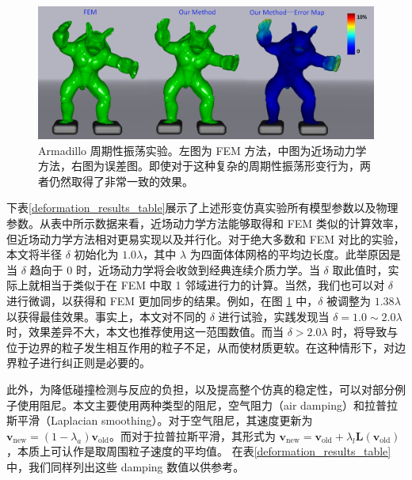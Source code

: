 \begin{figure}[!htb]
  \centering
  \captionsetup{justification=centering}
  \includegraphics[width=0.9\linewidth]{chap/image/demo_armadillo_vs_fem}

  \caption{\label{demo_armadillo_vs_fem}
           Armadillo 周期性振荡实验。左图为 FEM 方法，中图为近场动力学方法，右图为误差图。即使对于这种复杂的周期性振荡形变行为，两者仍然取得了非常一致的效果。
          }
\end{figure}

下表\ref{deformation_results_table}展示了上述形变仿真实验所有模型参数以及物理参数。从表中所示数据来看，近场动力学方法能够取得和 FEM 类似的计算效率，但近场动力学方法相对更易实现以及并行化。对于绝大多数和 FEM 对比的实验，本文将半径 $\delta$ 初始化为 $1.0\lambda$，其中 $\lambda$ 为四面体体网格的平均边长度。此举原因是当 $\delta$ 趋向于 0 时，近场动力学将会收敛到经典连续介质力学。当 $\delta$ 取此值时，实际上就相当于类似于在 FEM 中取 1 邻域进行力的计算。当然，我们也可以对 $\delta$ 进行微调，以获得和 FEM 更加同步的结果。例如，在图 \ref{demo_armadillo_vs_fem} 中，$\delta$ 被调整为 $1.38\lambda$ 以获得最佳效果。事实上，本文对不同的 $\delta$ 进行试验，实践发现当 $\delta = 1.0\sim2.0 \lambda$ 时，效果差异不大，本文也推荐使用这一范围数值。而当 $\delta > 2.0 \lambda$ 时，将导致与位于边界的粒子发生相互作用的粒子不足，从而使材质更软。在这种情形下，对边界粒子进行纠正则是必要的。

此外，为降低碰撞检测与反应的负担，以及提高整个仿真的稳定性，可以对部分例子使用阻尼。本文主要使用两种类型的阻尼，空气阻力（air damping）和拉普拉斯平滑（Laplacian smoothing）。对于空气阻尼，其速度更新为 $\textbf{v}_{\mathrm{new}} = (1 - \lambda_{a})\textbf{v}_{\mathrm{old}}$。而对于拉普拉斯平滑，其形式为 $\textbf{v}_{\mathrm{new}} = \textbf{v}_{\mathrm{old}}+ \lambda_l\textbf{L}(\textbf{v}_\mathrm{old})$，本质上可认作是取周围粒子速度的平均值。 在表\ref{deformation_results_table} 中，我们同样列出这些 damping 数值以供参考。

